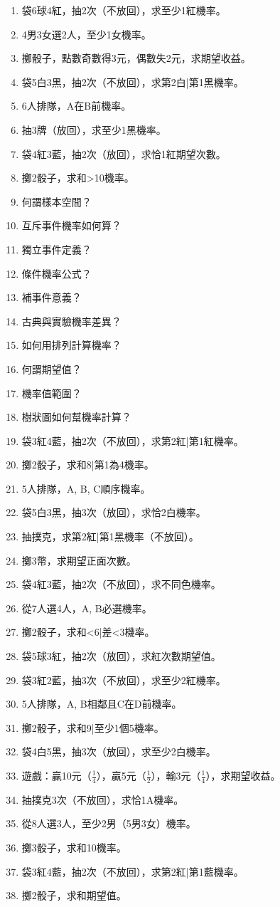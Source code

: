 \begin{enumerate}[label=\arabic*.]
    \item 袋6球4紅，抽2次（不放回），求至少1紅機率。
    \item 4男3女選2人，至少1女機率。
    \item 擲骰子，點數奇數得3元，偶數失2元，求期望收益。
    \item 袋5白3黑，抽2次（不放回），求第2白|第1黑機率。
    \item 6人排隊，A在B前機率。
    \item 抽3牌（放回），求至少1黑機率。
    \item 袋4紅3藍，抽2次（放回），求恰1紅期望次數。
    \item 擲2骰子，求和>10機率。
    \item 何謂樣本空間？
    \item 互斥事件機率如何算？
    \item 獨立事件定義？
    \item 條件機率公式？
    \item 補事件意義？
    \item 古典與實驗機率差異？
    \item 如何用排列計算機率？
    \item 何謂期望值？
    \item 機率值範圍？
    \item 樹狀圖如何幫機率計算？
    \item 袋3紅4藍，抽2次（不放回），求第2紅|第1紅機率。
    \item 擲2骰子，求和8|第1為4機率。
    \item 5人排隊，A, B, C順序機率。
    \item 袋5白3黑，抽3次（放回），求恰2白機率。
    \item 抽撲克，求第2紅|第1黑機率（不放回）。
    \item 擲3幣，求期望正面次數。
    \item 袋4紅3藍，抽2次（不放回），求不同色機率。
    \item 從7人選4人，A, B必選機率。
    \item 擲2骰子，求和<6|差<3機率。
    \item 袋5球3紅，抽2次（放回），求紅次數期望值。
    \item 袋3紅2藍，抽3次（不放回），求至少2紅機率。
    \item 5人排隊，A, B相鄰且C在D前機率。
    \item 擲2骰子，求和9|至少1個5機率。
    \item 袋4白5黑，抽3次（放回），求至少2白機率。
    \item 遊戲：贏10元（$\frac{1}{4}$），贏5元（$\frac{1}{2}$），輸3元（$\frac{1}{4}$），求期望收益。
    \item 抽撲克3次（不放回），求恰1A機率。
    \item 從8人選3人，至少2男（5男3女）機率。
    \item 擲3骰子，求和10機率。
    \item 袋3紅4藍，抽2次（不放回），求第2紅|第1藍機率。
    \item 擲2骰子，求和期望值。
\end{enumerate}